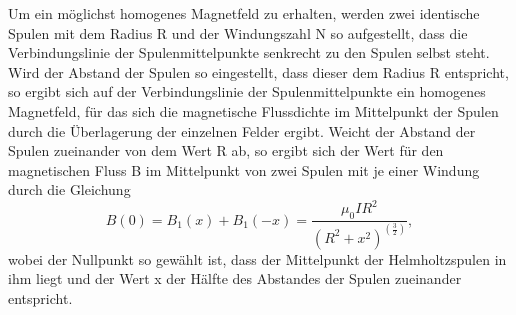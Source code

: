 Um ein möglichst homogenes Magnetfeld zu erhalten, werden zwei identische Spulen mit dem Radius R und der Windungszahl N 
so aufgestellt, dass die Verbindungslinie der Spulenmittelpunkte senkrecht zu den Spulen selbst steht. Wird der Abstand 
der Spulen so eingestellt, dass dieser dem Radius R entspricht, so ergibt sich auf der Verbindungslinie der 
Spulenmittelpunkte ein homogenes Magnetfeld, für das sich die magnetische Flussdichte im Mittelpunkt der Spulen durch
die Überlagerung der einzelnen Felder ergibt. 
Weicht der Abstand der Spulen zueinander von dem Wert R ab, so ergibt sich der Wert für den magnetischen Fluss B im 
Mittelpunkt von zwei Spulen mit je einer Windung durch die Gleichung
\begin{equation}
    B(0) = B_1(x) + B_1(-x) = \frac{\mu_0 I R^2}{(R^2 + x^2)^(\frac{3}{2})},
\end{equation}
\noindent
wobei der Nullpunkt so gewählt ist, dass der Mittelpunkt der Helmholtzspulen in ihm liegt und der Wert x 
der Hälfte des Abstandes der Spulen zueinander entspricht.









\cite{sample}
